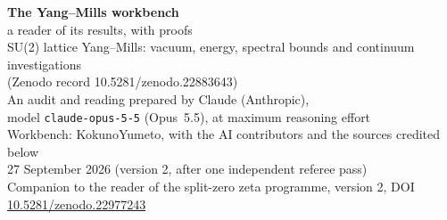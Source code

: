 


\thispagestyle{plain}
\begin{center}
{\LARGE\bfseries The Yang--Mills workbench}\\[8pt]
{\Large a reader of its results, with proofs}\\[6pt]
{\large SU(2) lattice Yang--Mills: vacuum, energy, spectral bounds and continuum investigations\\ (Zenodo record 10.5281/zenodo.22883643)}\\[14pt]
{\large An audit and reading prepared by Claude (Anthropic),\\ model \texttt{claude-opus-5-5} (Opus~5.5), at maximum reasoning effort}\\[8pt]
{\normalsize Workbench: KokunoYumeto, with the AI contributors and the sources credited below}\\[4pt]
{\normalsize 27 September 2026 \quad (version 2, after one independent referee pass)}\\[4pt]
{\small Companion to the reader of the split-zero zeta programme, version 2, DOI \href{https://doi.org/10.5281/zenodo.22977243}{10.5281/zenodo.22977243}}
\end{center}



\tableofcontents
\clearpage










\appendix





